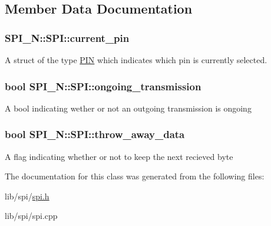 \subsection{Member Data Documentation}
\hypertarget{class_s_p_i___n_1_1_s_p_i_ac016c4eaed2db3f8b5523bf0d472ddd2}{
\subsubsection[{current\-\_\-pin}]{ S\-P\-I\-\_\-\-N\-::\-S\-P\-I\-::current\-\_\-pin\hspace{0.3cm}{\ttfamily [private]}}}\label{class_s_p_i___n_1_1_s_p_i_ac016c4eaed2db3f8b5523bf0d472ddd2}
A struct of the type \hyperlink{struct_s_p_i___n_1_1_p_i_n}{P\-I\-N} which indicates which pin is currently selected. \hypertarget{class_s_p_i___n_1_1_s_p_i_aff61d4bfc6a6e0088c3653898b1e91b8}{
\subsubsection[{ongoing\-\_\-transmission}]{\setlength{\rightskip}{0pt plus 5cm}bool S\-P\-I\-\_\-\-N\-::\-S\-P\-I\-::ongoing\-\_\-transmission\hspace{0.3cm}{\ttfamily [private]}}}\label{class_s_p_i___n_1_1_s_p_i_aff61d4bfc6a6e0088c3653898b1e91b8}
A bool indicating wether or not an outgoing transmission is ongoing \hypertarget{class_s_p_i___n_1_1_s_p_i_a7b2d300478662920e6911cea751e1094}{
\subsubsection[{throw\-\_\-away\-\_\-data}]{\setlength{\rightskip}{0pt plus 5cm}bool S\-P\-I\-\_\-\-N\-::\-S\-P\-I\-::throw\-\_\-away\-\_\-data\hspace{0.3cm}{\ttfamily [private]}}}\label{class_s_p_i___n_1_1_s_p_i_a7b2d300478662920e6911cea751e1094}
A flag indicating whether or not to keep the next recieved byte 

The documentation for this class was generated from the following files\-:\begin{DoxyCompactItemize}
\item 
lib/spi/\hyperlink{spi_8h}{spi.\-h}\item 
lib/spi/spi.\-cpp\end{DoxyCompactItemize}
